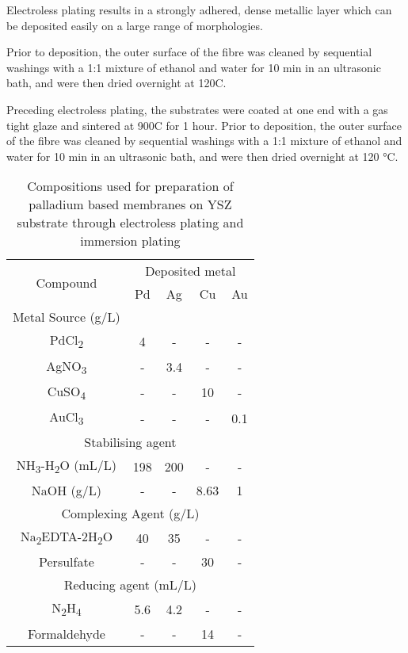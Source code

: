 Electroless plating results in a strongly adhered, dense metallic layer which can be deposited easily on a large range of morphologies.

Prior to deposition, the outer surface of the fibre was cleaned by sequential washings with a 1:1 mixture of ethanol and water for 10 min in an ultrasonic bath, and were then dried overnight at 120\textdegree C.

Preceding electroless plating, the substrates were coated at one end with a gas tight glaze and sintered at 900\textdegree C for 1 hour. Prior to deposition, the outer surface of the fibre was cleaned by sequential washings with a 1:1 mixture of ethanol and water for 10 min in an 
ultrasonic bath, and were then dried overnight at 120 °C.

\begin{table}[]
    \centering
    \caption{Compositions used for preparation of palladium based membranes on YSZ substrate through electroless plating and immersion plating}
    \label{ELP}
    \begin{tabular}{@{}ccccc@{}}
    \toprule
    \multirow{2}{*}{Compound} & \multicolumn{4}{c}{Deposited metal} \\
                              & Pd      & Ag     & Cu      & Au     \\ \midrule
    Metal Source (g/L)        &         &        &         &        \\ \midrule
    PdCl\textsubscript{2}                     & 4       & -      & -       & -      \\
    AgNO\textsubscript{3}                     & -       & 3.4    & -       & -      \\
    CuSO\textsubscript{4}                     & -       & -      & 10      & -      \\
    AuCl\textsubscript{3}                     & -       & -      & -       & 0.1    \\ \midrule
    \multicolumn{5}{c}{Stabilising agent}                           \\ \midrule
    NH\textsubscript{3}-H\textsubscript{2}O (mL/L)            & 198     & 200    & -       & -      \\
    NaOH (g/L)                & -       & -      & 8.63    & 1      \\ \midrule
    \multicolumn{5}{c}{Complexing Agent (g/L)}                      \\ \midrule
    Na\textsubscript{2}EDTA-2H\textsubscript{2}O              & 40      & 35     & -       & -      \\
    Persulfate                & -       & -      & 30      & -      \\ \midrule
    \multicolumn{5}{c}{Reducing agent (mL/L)}                       \\ \midrule
    N\textsubscript{2}H\textsubscript{4}                      & 5.6     & 4.2    & -       & -      \\
    Formaldehyde              & -       & -      & 14      & -      \\ \bottomrule
    \end{tabular}
    \end{table}

